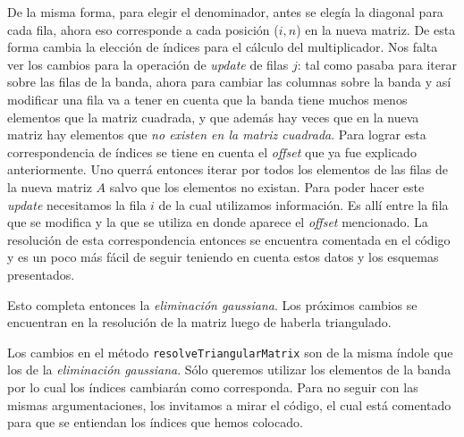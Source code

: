 De la misma forma, para elegir el denominador, antes se elegía la diagonal para cada fila, ahora eso corresponde a cada posición ($i,n$) en la nueva matriz. De esta forma cambia la elección de índices para el cálculo del multiplicador. Nos falta ver los cambios para la operación de \textit{update} de filas $j$: tal como pasaba para iterar sobre las filas de la banda, ahora para cambiar las columnas sobre la banda y así modificar una fila va a tener en cuenta que la banda tiene muchos menos elementos que la matriz cuadrada, y que además hay veces que en la nueva matriz hay elementos que \textit{no existen en la matriz cuadrada}. Para lograr esta correspondencia de índices se tiene en cuenta el \textit{offset} que ya fue explicado anteriormente. Uno querrá entonces iterar por todos los elementos de las filas de la nueva matriz $A$ salvo que los elementos no existan. Para poder hacer este \textit{update} necesitamos la fila $i$ de la cual utilizamos información. Es allí entre la fila que se modifica y la que se utiliza en donde aparece el \textit{offset} mencionado. La resolución de esta correspondencia entonces se encuentra comentada en el código y es un poco más fácil de seguir teniendo en cuenta estos datos y los esquemas presentados.

Esto completa entonces la \textit{eliminación gaussiana}. Los próximos cambios se encuentran en la resolución de la matriz luego de haberla triangulado.

\vspace{\baselineskip}

Los cambios en el método \texttt{resolveTriangularMatrix} son de la misma índole que los de la \textit{eliminación gaussiana}. Sólo queremos utilizar los elementos de la banda por lo cual los índices cambiarán como corresponda. Para no seguir con las mismas argumentaciones, los invitamos a mirar el código, el cual está comentado para que se entiendan los índices que hemos colocado.
\vspace{\baselineskip}


